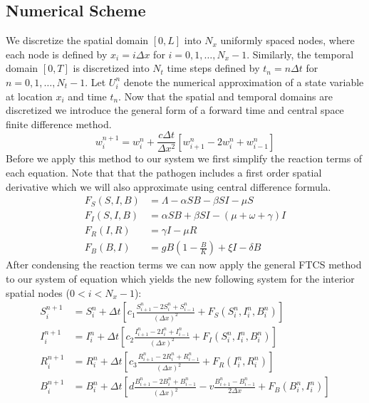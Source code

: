 \subsection{Numerical Scheme}
We discretize the spatial domain $[0, L]$ into $N_x$ uniformly spaced nodes, where each node is defined by $x_i = i \Delta x$ for $i = 0, 1, \dots, N_x-1$. Similarly, the temporal domain $[0, T]$ is discretized into $N_t$ time steps defined by $t_n = n \Delta t$ for $n = 0, 1, \dots, N_t-1$. Let $U_i^n$ denote the numerical approximation of a state variable at location $x_i$ and time $t_n$. Now that the spatial and temporal domains are discretized we introduce the general form of a forward time and central space finite difference method. 
\begin{equation*}
    w_i^{n+1} = w_i^n + \frac{c \Delta t}{\Delta x^2} \left[  w_{i+1}^n - 2w_i^n + w_{i-1}^n  \right]
\end{equation*}
Before we apply this method to our system we first simplify the reaction terms of each equation. Note that that the pathogen includes a first order spatial derivative which we will also approximate using central difference formula.
\begin{align}
    F_S(S, I, B) &= \Lambda - \alpha S B - \beta S I - \mu S \\[6pt]
    F_I(S, I, B) &= \alpha S B + \beta S I - (\mu + \omega + \gamma) I \\[6pt]
    F_R(I, R) &= \gamma I - \mu R \\[6pt]
    F_B(B, I) &= g B \left(1 - \frac{B}{K}\right) + \xi I - \delta B
\end{align}
After condensing the reaction terms we can now apply the general FTCS method to our system of equation which yields the new following system for the interior spatial nodes ($0 < i < N_x - 1$):
\begin{align}
    S_i^{n+1} &= S_i^n + \Delta t \left[ c_1 \frac{S_{i+1}^n - 2S_i^n + S_{i-1}^n}{(\Delta x)^2} + F_S(S_i^n, I_i^n, B_i^n) \right] \label{susceptible} \\[10pt]
    I_i^{n+1} &= I_i^n + \Delta t \left[ c_2 \frac{I_{i+1}^n - 2I_i^n + I_{i-1}^n}{(\Delta x)^2} + F_I(S_i^n, I_i^n, B_i^n) \right] \label{infected} \\[10pt]
    R_i^{n+1} &= R_i^n + \Delta t \left[ c_3 \frac{R_{i+1}^n - 2R_i^n + R_{i-1}^n}{(\Delta x)^2} + F_R(I_i^n, R_i^n) \right] \label{recovered} \\[10pt]
    B_i^{n+1} &= B_i^n + \Delta t \left[ d \frac{B_{i+1}^n - 2B_i^n + B_{i-1}^n}{(\Delta x)^2} - v \frac{B_{i+1}^n - B_{i-1}^n}{2\Delta x} + F_B(B_i^n, I_i^n) \right] \label{pathogen}
\end{align}
